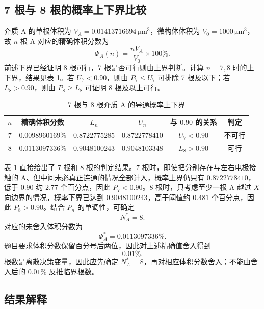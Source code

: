 \documentclass[withoutpreface,bwprint]{cumcmthesis}
\begin{document}
\subsection{7 根与 8 根的概率上下界比较}

介质 A 的单根体积为 $V_A=0.01413716694\,\mathrm{\mu m^3}$，微构体体积为 $V_0=1000\,\mathrm{\mu m^3}$，故 $n$ 根 A 对应的精确体积分数为
\begin{equation}
 \Phi_A(n)=\frac{nV_A}{V_0}\times100\%.
 \label{eq:q3-phi}
\end{equation}
前述下界已经证明 8 根可行，7 根是否可行则由上界判断。计算 $n=7,8$ 时的上下界，结果见表 \ref{tab:q3-bound}。若 $U_7<0.90$，则由 $P_7\le U_7$ 可排除 7 根及以下；若 $L_8>0.90$，则由 $P_8\ge L_8$ 可证明 8 根及以上可行。

\begin{table}[H]
\centering
\caption{7 根与 8 根介质 A 的导通概率上下界}
\label{tab:q3-bound}
\begin{tabular}{cccccc}
\toprule
$n$ & 精确体积分数 & $L_n$ & $U_n$ & 与 $0.90$ 的关系 & 判定 \\
\midrule
7 & $0.0098960169\%$ & $0.8722775285$ & $0.8722778410$ & $U_7<0.90$ & 不可行 \\
8 & $0.0113097336\%$ & $0.9048100243$ & $0.9048103348$ & $L_8>0.90$ & 可行 \\
\bottomrule
\end{tabular}
\end{table}

表 \ref{tab:q3-bound} 直接给出了 7 根和 8 根的判定结果。7 根时，即使把分别存在与左右电极接触的 A、但中间未必真正连通的情况全部计入，概率上界仍只有 $0.8722778410$，低于 $0.90$ 约 $2.77$ 个百分点，因此 \textbf{$P_7<0.90$}。8 根时，只考虑至少一根 A 越过 $X$ 向边界的情况，概率下界已达到 $0.9048100243$，高于阈值约 $0.481$ 个百分点，因此 \textbf{$P_8>0.90$}。结合 $P_n$ 的单调性，可确定
\begin{equation}
 \boxed{N_A^{*}=8}.
\end{equation}
对应的未舍入体积分数为
\[
\Phi_A^{*}=0.0113097336\%.
\]
题目要求体积分数保留百分号后两位，因此对上述精确值舍入得到
\begin{equation}
 \boxed{0.01\%}.
\end{equation}
根数是离散决策变量，因此应先确定 $N_A^*=8$，再对相应体积分数舍入；不能由舍入后的 $0.01\%$ 反推临界根数。

\subsection{结果解释}
\end{document}
